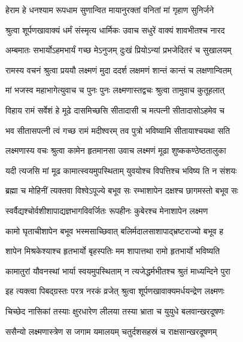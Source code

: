 
\twolineshloka
{हेराम हे धनश्याम रूपधाम सुणान्वित}
{मायानुरक्तां वनितां मां गृहाण सुनिर्जने}%


\twolineshloka
{श्रुत्वा शूर्पणखावाक्यं धर्मं संस्मृत्य धार्मिकः}
{उवाच सधुरें वाक्यं शावभीतश्च नारद}%


\twolineshloka
{अम्बमातः सभार्योऽहमभार्यं गच्छ मेऽनुजम्}
{दुःखं प्रियोऽन्यां प्रभजेदितरं च सुखालयम्}%


\twolineshloka
{रामस्य वचनं श्रुत्वा प्रययौ लक्ष्मणं मुदा}
{ददर्श लक्षमणं शान्तं कान्तं च लक्षणान्वितम्}%


\twolineshloka
{मां भजस्व महाभागेत्युवाच च पुनः पुनः}
{लक्ष्मणास्तद्वचः श्रुत्वा तामुवाच कुतूहलात्}%


\twolineshloka
{विहाय रामं सर्वेशं हे मूढे दासमिच्छसि}
{सीतादासी च मत्पत्नी सीतादासोऽहमेव च}%


\twolineshloka
{भव सीतासपत्नी त्वं गच्छ रामं मदीश्वरम्}
{तव पुत्रो भविष्यामि सीतायाश्चयथा सति}%


\twolineshloka
{लक्ष्मणास्य वचः श्रुत्वा कामेन हृतमानसा}
{उवाच लक्ष्मणं मूढा शुष्ककण्ठेष्ठतालुका}%


\twolineshloka
{यदी त्यजसि मां मूढ कामात्स्वयमुपस्थिताम्}
{युवयोश्च विपत्तिश्च भविष्य ति न संशयः}%


\twolineshloka
{ब्रह्मा च मोहिनीं त्यक्तवा विश्वेऽपूज्ये बभूव सः}
{रम्भाशापेन दक्षश्च छागमस्तो बभूव सः}%


\twolineshloka
{स्वर्वैद्यश्चोर्वशीशापाद्यज्ञभागविवर्जितः}
{रूपहीनः कुबेरश्च मेनाशापेन लक्ष्मण}%


\twolineshloka
{कामो घृताचीशापेन बभूव भस्मसाच्छिवात्}
{बलिर्मदालसाशापाद्भ्रष्टराज्यो बभूव ह}%


\twolineshloka
{शापेन मिश्रकेश्याश्च हृतभार्यो बृहस्पतिः}
{मम शापात्तथा रामो हृतभार्यो भविष्यति}%


\twolineshloka
{कामातुरां यौवनस्थां भार्या स्वयमुपस्थिताम्}
{न त्यजेद्धर्मभीतश्च श्रुतं माध्यन्दिने पुरा}%


\twolineshloka
{इह त्यक्त्वा पिबद्ग्रस्तः परत्र नरकं व्रजेत्}
{श्रुत्वा शूर्पणखावाक्यमर्धयन्द्रेण लक्ष्मणः}%


\twolineshloka
{चिच्छेद नासिकां तस्याः क्षुरधारेण लीलया}
{तस्या भ्राता च युयुधे बलवान्खरदूषणः}%


\twolineshloka
{ससैन्यो लक्ष्मणास्त्रेण स जगाम यमालयम्}
{चतुर्दशसहस्रं च राक्षसान्खरदूषणम्}%


